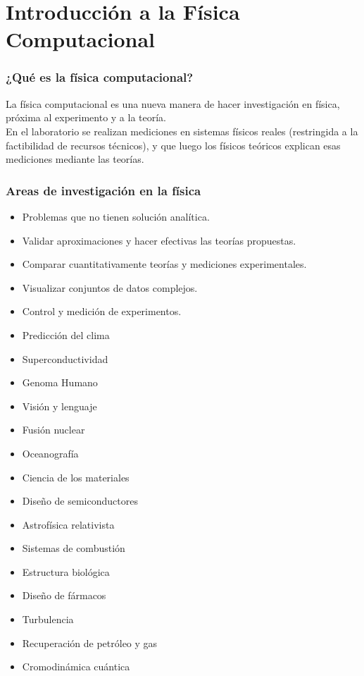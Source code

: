 \section{Introducción a la Física Computacional}
\begin{frame}
\frametitle{¿Qué es la física computacional?}
La física computacional es una nueva manera de hacer investigación en física, próxima al
experimento y a la teoría.
\\
\medskip
En el laboratorio se realizan mediciones en sistemas físicos reales (restringida a la factibilidad de recursos técnicos), y que luego los físicos teóricos explican esas mediciones mediante las teorías.
\end{frame}
\begin{frame}
\frametitle{Areas de investigación en la física}
\begin{itemize}[<+->]
	\item Problemas que no tienen solución analítica.
	\item Validar aproximaciones y hacer efectivas las teorías propuestas.
	\item Comparar cuantitativamente teorías y mediciones experimentales.
	\item Visualizar conjuntos de datos complejos.
	\item Control y medición de experimentos.
\end{itemize}
\end{frame}
\begin{frame}
\fontsize{14}{14}\selectfont
\begin{multicols}{2}
\begin{itemize}[<+->]
	\item Predicción del clima
	\item Superconductividad
	\item Genoma Humano
	\item Visión y lenguaje
	\item Fusión nuclear
	\item Oceanografía
	\item Ciencia de los materiales
	\item Diseño de semiconductores
	\item Astrofísica relativista
	\item Sistemas de combustión
	\item Estructura biológica
	\item Diseño de fármacos
	\item Turbulencia
	\item Recuperación de petróleo y gas
	\item Cromodinámica cuántica
\end{itemize}
\end{multicols}
\end{frame}
